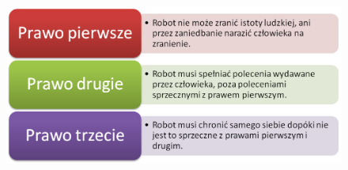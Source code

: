 \begin{figure}[hb]
 \centering
 \includegraphics[height=75mm]{../images/ch01/assimov_laws.png}
 
 \label{fig:Assimov_Laws}
\end{figure}

